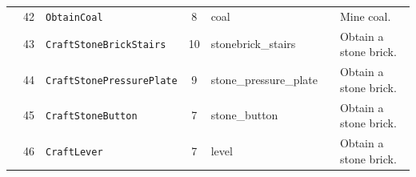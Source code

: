 \begin{table}[H]
{\begin{tabular}{@{}cclclcl@{}}
                      & 42  & \texttt{ObtainCoal}               & 8               & coal                    &                         & Mine coal.                      \\
                      & 43  & \texttt{CraftStoneBrickStairs}    & 10              & stonebrick\_stairs      &                         & Obtain a stone brick.           \\
                      & 44  & \texttt{CraftStonePressurePlate}  & 9               & stone\_pressure\_plate  &                         & Obtain a stone brick.           \\
                      & 45  & \texttt{CraftStoneButton}         & 7               & stone\_button           &                         & Obtain a stone brick.           \\
                      & 46  & \texttt{CraftLever}               & 7               & level                   &                         & Obtain a stone brick.              \\ \bottomrule
\end{tabular}}
\end{table}

